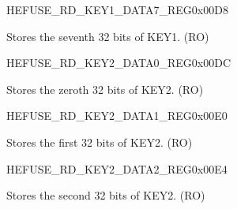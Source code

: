 \begin{register}{H}{EFUSE\_RD\_KEY1\_DATA7\_REG}{0x00D8}\label{regdesc:EFUSERDKEY1DATA7REG}
%
\regnewline%
\begin{regdesc}\begin{reglist}
\label{fielddesc:EFUSEKEY1DATA7}\item [EFUSE\_KEY1\_DATA7] Stores the seventh 32 bits of KEY1. (RO)
\end{reglist}\end{regdesc}
\end{register}


\begin{register}{H}{EFUSE\_RD\_KEY2\_DATA0\_REG}{0x00DC}\label{regdesc:EFUSERDKEY2DATA0REG}
%
\regnewline%
\begin{regdesc}\begin{reglist}
\label{fielddesc:EFUSEKEY2DATA0}\item [EFUSE\_KEY2\_DATA0] Stores the zeroth 32 bits of KEY2. (RO)
\end{reglist}\end{regdesc}
\end{register}


\begin{register}{H}{EFUSE\_RD\_KEY2\_DATA1\_REG}{0x00E0}\label{regdesc:EFUSERDKEY2DATA1REG}
%
\regnewline%
\begin{regdesc}\begin{reglist}
\label{fielddesc:EFUSEKEY2DATA1}\item [EFUSE\_KEY2\_DATA1] Stores the first 32 bits of KEY2. (RO)
\end{reglist}\end{regdesc}
\end{register}


\begin{register}{H}{EFUSE\_RD\_KEY2\_DATA2\_REG}{0x00E4}\label{regdesc:EFUSERDKEY2DATA2REG}
%
\regnewline%
\begin{regdesc}\begin{reglist}
\label{fielddesc:EFUSEKEY2DATA2}\item [EFUSE\_KEY2\_DATA2] Stores the second 32 bits of KEY2. (RO)
\end{reglist}\end{regdesc}
\end{register}


